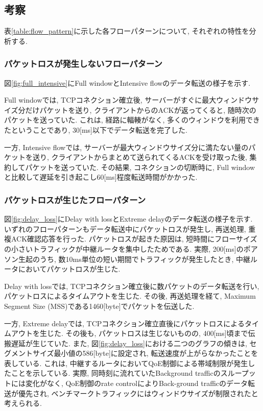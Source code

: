 \subsection{考察}
表\ref{table:flow_pattern}に示した各フローパターンについて, それぞれの特性を分析する.

\subsubsection{パケットロスが発生しないフローパターン}
図\ref{fig:full_intensive}にFull windowとIntensive flowのデータ転送の様子を示す.

Full windowでは, TCPコネクション確立後, サーバーがすぐに最大ウィンドウサイズ分だけパケットを送り,
クライアントからのACKが返ってくると, 随時次のパケットを送っていた.
これは, 経路に輻輳がなく, 多くのウィンドウを利用できたということであり, 30[ms]以下でデータ転送を完了した.

一方, Intensive flowでは, サーバーが最大ウィンドウサイズ分に満たない量のパケットを送り,
クライアントからまとめて送られてくるACKを受け取った後, 集約してパケットを送っていた.
その結果, コネクションの切断時に, Full windowと比較して遅延を引き起こし60[ms]程度転送時間がかかった.

\subsubsection{パケットロスが生じたフローパターン}
図\ref{fig:delay_loss}にDelay with lossとExtreme delayのデータ転送の様子を示す.
いずれのフローパターンもデータ転送中にパケットロスが発生し, 再送処理, 重複ACK確認応答を行った.
パケットロスが起きた原因は, 短時間にフローサイズの小さいトラフィックが中継ルータを集中したためである.
実際, 200[ms]のポアソン生起のうち, 数10ms単位の短い期間でトラフィックが発生したとき, 中継ルータにおいてパケットロスが生じた.

Delay with lossでは, TCPコネクション確立後に数パケットのデータ転送を行い, パケットロスによるタイムアウトを生じた.
その後, 再送処理を経て, Maximum Segment Size (MSS)である1460[byte]でパケットを伝送した.

一方, Extreme delayでは, TCPコネクション確立直後にパケットロスによるタイムアウトを生じた.
その後も, パケットロスは生じないものの, 400[ms]頃まで伝搬遅延が生じていた.
また, 図\ref{fig:delay_loss}における二つのグラフの傾きは, セグメントサイズ最小値の586[byte]に設定され,
転送速度が上がらなかったことを表している.
これは, 中継するルータにおいてQoE制御による帯域制限が発生したことを示している.
実際, 同時刻に流れていたBackground trafficのスループットには変化がなく, QoE制御のrate controlによりBack-ground
trafficのデータ転送が優先され, ベンチマークトラフィックにはウィンドウサイズが制限されたと考えられる.


